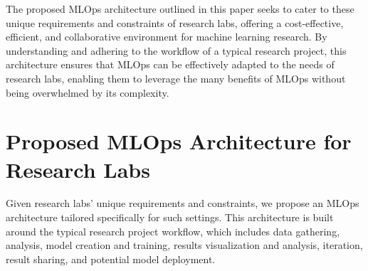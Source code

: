The proposed MLOps architecture outlined in this paper seeks to cater to these unique requirements and constraints of research labs, offering a cost-effective, efficient, and collaborative environment for machine learning research. By understanding and adhering to the workflow of a typical research project, this architecture ensures that MLOps can be effectively adapted to the needs of research labs, enabling them to leverage the many benefits of MLOps without being overwhelmed by its complexity.



\section{Proposed MLOps Architecture for Research Labs \label{proposed}}
Given research labs' unique requirements and constraints, we propose an MLOps architecture tailored specifically for such settings. This architecture is built around the typical research project workflow, which includes data gathering, analysis, model creation and training, results visualization and analysis, iteration, result sharing, and potential model deployment.

